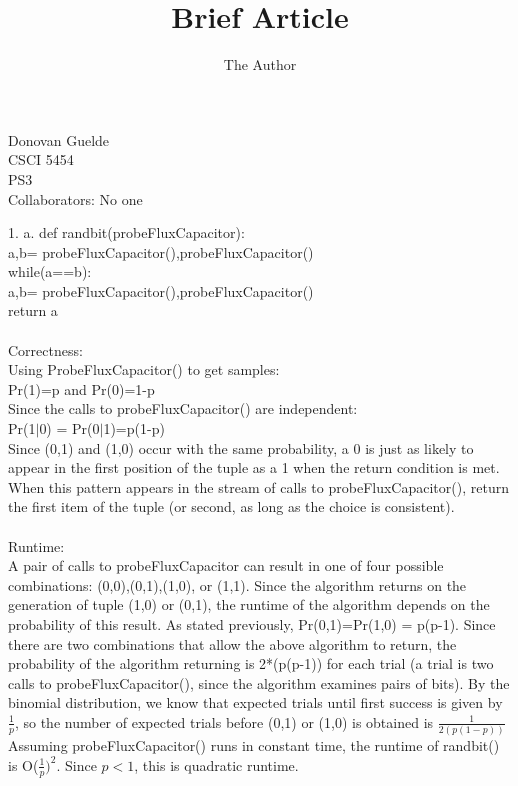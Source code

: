 \documentclass[11pt, oneside]{article}   	%
\title{Brief Article}
\author{The Author}
\begin{document}
\begin{flushright}
Donovan Guelde\\
CSCI 5454\\
PS3\\
Collaborators: No one\\
\end{flushright}
1. a.  def randbit(probeFluxCapacitor):\\
\indent\indent a,b= probeFluxCapacitor(),probeFluxCapacitor()\\
\indent\indent while(a==b):\\
\indent\indent\indent a,b= probeFluxCapacitor(),probeFluxCapacitor()\\
\indent\indent return a\\\\
Correctness:\\
\indent Using ProbeFluxCapacitor() to get samples:\\
\indent Pr(1)=p and Pr(0)=1-p\\
\indent Since the calls to probeFluxCapacitor() are independent:\\
\indent Pr(1$|$0) = Pr(0$|$1)=p(1-p)\\
\indent Since (0,1) and (1,0) occur with the same probability, a 0 is just as likely to appear in the first position of the tuple as a 1 when the return condition is met.  When this pattern appears in the stream of calls to probeFluxCapacitor(), return the first item of the tuple (or second, as long as the choice is consistent).\\\\
Runtime:\\
\indent A pair of calls to probeFluxCapacitor can result in one of four possible combinations: (0,0),(0,1),(1,0), or (1,1).  Since the algorithm returns on the generation of tuple (1,0) or (0,1), the runtime of the algorithm depends on the probability of this result. As stated previously, Pr(0,1)=Pr(1,0) = p(p-1).  Since there are two combinations that allow the above algorithm to return, the probability of the algorithm returning is 2*(p(p-1)) for each trial (a trial is two calls to probeFluxCapacitor(), since the algorithm examines pairs of bits).  By the binomial distribution, we know that expected trials until first success is given by $\frac{1}{p}$, so the number of expected trials before (0,1) or (1,0) is obtained is $\frac{1}{2(p(1-p))}$\\
\indent Assuming probeFluxCapacitor() runs in constant time, the runtime of randbit() is O($\frac{1}{p})^2$.  Since $p<1$, this is quadratic runtime.\\\\\\
\end{document}
